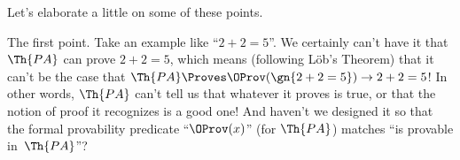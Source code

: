 %
%
%
%
%


Let's elaborate a little on some of these points.

The first point. Take an example like ``$2+2=5$''. We certainly can't
have it that $\Th{PA}$ can prove $2+2=5$, which means (following
L\"ob's Theorem) that it can't be the case that $\Th{PA} \Proves
\OProv(\gn{2+2=5}) \to 2+2=5$!{} In other words, $\Th{PA}$ can't
tell us that whatever it proves is true, or that the notion of proof
it recognizes is a good one!{} And haven't we designed it so that the
formal provability predicate ``$\OProv(x)$'' (for $\Th{PA}$)
matches ``is provable in~$\Th{PA}$''?

